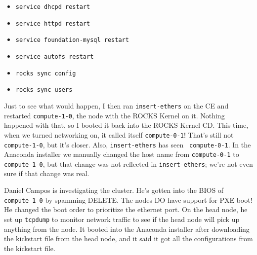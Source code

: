 \documentclass[12pt]{article}
\begin{document}
\begin{itemize}
\item {\tt service dhcpd restart}
\item {\tt service httpd restart}
\item {\tt service foundation-mysql restart}
\item {\tt service autofs restart}
\item {\tt rocks sync config}
\item {\tt rocks sync users}
\end{itemize}

Just to see what would happen, I then ran {\tt insert-ethers} on the CE and
restarted {\tt compute-1-0}, the node with the ROCKS Kernel on it. Nothing
happened with that, so I booted it back into the ROCKS Kernel CD. This time,
when we turned networking on, it called itself {\tt compute-0-1}! That's still
not {\tt compute-1-0}, but it's closer. Also, {\tt insert-ethers} has seen {\tt
  compute-0-1}. In the Anaconda installer we manually changed the host name from
{\tt compute-0-1} to {\tt compute-1-0}, but that change was not reflected in
{\tt insert-ethers}; we're not even sure if that change was real.

\qq Daniel Campos is investigating the cluster. He's gotten into the BIOS of
{\tt compute-1-0} by spamming DELETE. The nodes DO have support for
PXE boot! He changed the boot order to prioritize the ethernet port. On the head
node, he set up {\tt tcpdump} to monitor network traffic to see if the head node
will pick up anything from the node. It booted into the Anaconda installer after
downloading the kickstart file from the head node, and it said it got all the
configurations from the kickstart file. 

\end{document}
